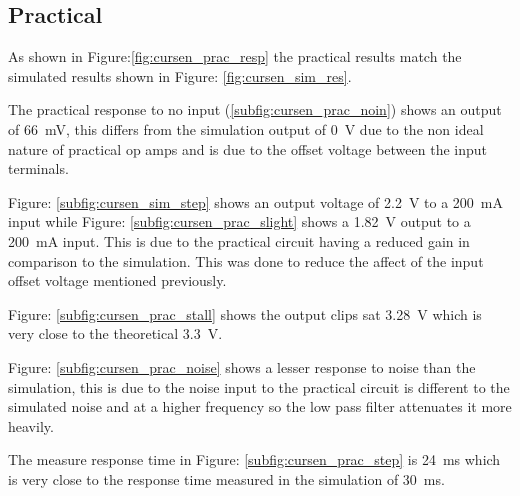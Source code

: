 \clearpage
\subsection{Practical}
As shown in Figure:\ref{fig:cursen_prac_resp} the practical results match the simulated results shown in Figure: \ref{fig:cursen_sim_res}. 

The practical response to no input (\ref{subfig:cursen_prac_noin}) shows an output of \SI{66}{\milli\volt}, this differs from the simulation output of \SI{0}{\volt} due to the non ideal nature of practical op amps and is due to the offset voltage between the input terminals.

Figure: \ref{subfig:cursen_sim_step} shows an output voltage of \SI{2.2}{\volt} to a \SI{200}{\milli\ampere} input while Figure: \ref{subfig:cursen_prac_slight} shows a \SI{1.82}{\volt} output to a  \SI{200}{\milli\ampere} input. This is due to the practical circuit having a reduced gain in comparison to the simulation. This was done to reduce the affect of the input offset voltage mentioned previously. 

Figure: \ref{subfig:cursen_prac_stall} shows the output clips sat \SI{3.28}{\volt} which is very close to the theoretical \SI{3.3}{\volt}. 

Figure: \ref{subfig:cursen_prac_noise} shows a lesser response to noise than the simulation, this is due to the noise input to the practical circuit is different to the simulated noise and at a higher frequency so the low pass filter attenuates it more heavily.

The measure response time in Figure: \ref{subfig:cursen_prac_step} is \SI{24}{\milli\second} which is very close to the response time measured in the simulation of \SI{30}{\milli\second}.


